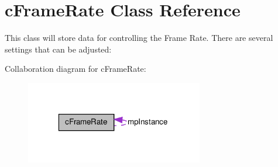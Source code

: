 \hypertarget{classc_frame_rate}{
\section{cFrameRate Class Reference}
\label{classc_frame_rate}
}


This class will store data for controlling the Frame Rate. There are several settings that can be adjusted:  




Collaboration diagram for cFrameRate:\nopagebreak
\begin{figure}[H]
\begin{center}
\leavevmode
\includegraphics[width=220pt]{classc_frame_rate__coll__graph}
\end{center}
\end{figure}
